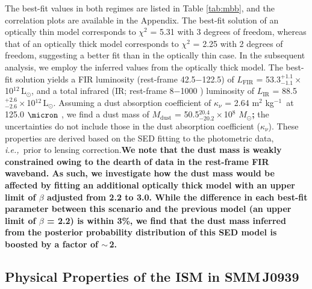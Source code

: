 \documentclass[iop]{emulateapj}
\newcommand{\Msun}{\mbox{$M_{\odot}$}}
\newcommand{\Lsun}{\mbox{L$_{\odot}$}}
\newcommand{\ie}{{\sl i.e.,~}}
\newcommand{\pmOne}{\mbox{$^{-1}$}}
\begin{document}

The best-fit values in both regimes are listed in Table \ref{tab:mbb}, and the correlation plots are available in the Appendix. The best-fit solution of an optically thin
model corresponds to $\chi^2$ = 5.31 with 3 degrees of freedom, whereas that of an optically thick model
corresponds to $\chi^2$ = 2.25 with 2 degrees of freedom, suggesting a better fit than in the optically thin
case. In the subsequent analysis, we employ the inferred values from the optically thick model.
The best-fit solution yields a FIR luminosity (rest-frame 42.5$-$122.5\micron) of $L_\textrm{FIR}$ = 53.3$^{+1.1}_{-1.1}$\,$\times$\,10$^{12}$\,\Lsun, and a total infrared (IR; rest-frame 8$-$1000 \micron) luminosity of $L_\textrm{IR}$ = 88.5$^{+2.6}_{-2.6}$\,$\times$\,10$
^{12}$\,\Lsun. Assuming a dust absorption coefficient of $\kappa_{\nu}$ = 2.64\,\,m$^2$\,\,kg\pmOne\ at 125.0\,\,$
\micron$ \citep{Dunne03a}, we find a dust mass of $M_\textrm{dust}$ = 50.5$^{20.4}_{-20.2}\times$10$^8$\,\,\Msun{\bf ;} the uncertainties do not include those in the dust absorption coefficient ($\kappa_{\nu}$). These properties are derived based on the SED fitting to the photometric data, \ie prior
to lensing correction.{\bf We note that the dust mass is weakly constrained owing to the dearth of data in the {\bf rest-frame} FIR waveband. As such, we investigate how the dust mass would be affected by fitting an additional optically thick model with an upper limit of 
 $\beta$ adjusted from 2.2 to 3.0. While the difference in each best-fit parameter between this scenario and the previous model (an upper limit of $\beta$ = 2.2) is within 3\%, we find that the dust mass inferred from the posterior probability distribution of this SED model is boosted by a factor of $\sim$\,2.}
\subsection{Physical Properties of the ISM in SMM\,J0939}
\end{document}
